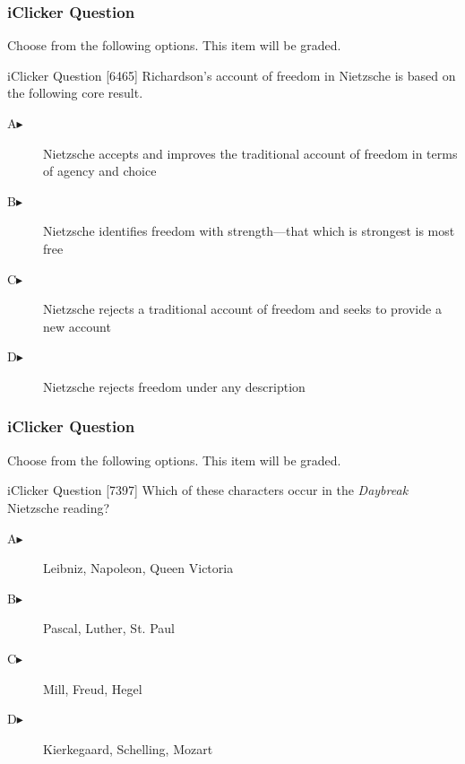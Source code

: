 \documentclass[xcolor=dvipsnames]{beamer}
\begin{document}
\begin{frame}
  \frametitle{iClicker Question}
Choose from the following options. This item will be graded.
\begin{block}{iClicker Question}
[6465] Richardson's account of freedom in Nietzsche is based on the following core result.
\end{block}
\begin{description}
\item[A\hspace{.2in}$\blacktriangleright$] Nietzsche accepts and improves the traditional account of freedom in terms of agency and choice
\item[B\hspace{.2in}$\blacktriangleright$] Nietzsche identifies freedom with strength---that which is strongest is most free
\item[C\hspace{.2in}$\blacktriangleright$] Nietzsche rejects a traditional account of freedom and seeks to provide a new account
\item[D\hspace{.2in}$\blacktriangleright$] Nietzsche rejects freedom under any description
\end{description}
\end{frame}

\begin{frame}
  \frametitle{iClicker Question}
Choose from the following options. This item will be graded.
\begin{block}{iClicker Question}
[7397] Which of these characters occur in the \emph{Daybreak} Nietzsche reading?
\end{block}
\begin{description}
\item[A\hspace{.2in}$\blacktriangleright$] Leibniz, Napoleon, Queen Victoria
\item[B\hspace{.2in}$\blacktriangleright$] Pascal, Luther, St. Paul
\item[C\hspace{.2in}$\blacktriangleright$] Mill, Freud, Hegel
\item[D\hspace{.2in}$\blacktriangleright$] Kierkegaard, Schelling, Mozart
\end{description}
\end{frame}
\end{document}
